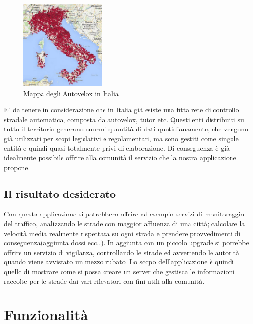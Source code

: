 \documentclass[a4paper,12pt]{report}
\begin{document}
\begin{figure}
  \vspace{-40pt}
  \begin{center}
      \includegraphics[width=0.38\textwidth]{images/mappaAutoveloxItalia}
    \caption{Mappa degli Autovelox in Italia}
    \label{fig:mappaAutoveloxItalia}
  \end{center}
  \vspace{-10pt}
\end{figure}
E' da tenere in considerazione che in Italia già esiste una fitta rete di 
controllo stradale automatica, composta da autovelox, tutor etc. Questi enti 
distribuiti su tutto il territorio generano enormi quantità di dati 
quotidianamente, che vengono già utilizzati per scopi legislativi e 
regolamentari, ma sono gestiti come singole entità e quindi quasi totalmente 
privi di elaborazione. \newline
Di conseguenza è già idealmente possibile offrire alla comunità il servizio che 
la nostra applicazione propone.

\subsection*{Il risultato desiderato}
Con questa applicazione si potrebbero offrire ad esempio servizi di 
monitoraggio del traffico, analizzando le strade con maggior affluenza di una 
città; calcolare la velocità media realmente rispettata su ogni strada e 
prendere provvedimenti di conseguenza(aggiunta dossi ecc..). In aggiunta con un 
piccolo upgrade si potrebbe offrire un servizio di vigilanza, controllando 
le strade ed avvertendo le autorità quando viene avvistato un mezzo 
rubato.\newline
Lo scopo dell’applicazione è quindi quello di mostrare come si possa creare un 
server che gestisca le informazioni raccolte per le strade dai vari rilevatori 
con fini utili alla comunità.

\section{Funzionalità}
\end{document}
